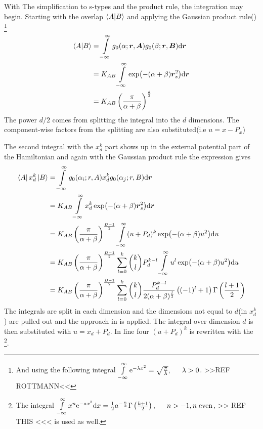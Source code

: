     With The simplification to s-types and the product rule, the integration
    may begin. Starting with the overlap $\braket{A}{B}$ and applying the
    Gaussian product rule() \footnote{And using the
    following integral $\infint \me^{-\lambda x^2} =
    \sqrt{\frac{\pi}{\lambda}},\indent \lambda>0$. >>REF ROTTMANN<<}
        \begin{align}
            \braket{A}{B} &= \int\limits^{\infty}_{-\infty} g_0(\alpha;\boldsymbol{{r}},\boldsymbol{{A}})
            g_0(\beta;\boldsymbol{{r}},\boldsymbol{{B}}) \mathrm{d}\boldsymbol{{r}} \nonumber \\
            &= K_{AB}\int\limits^{\infty}_{-\infty} \exp(-(\alpha+\beta)\boldsymbol{{r}}^2_s) \mathrm{d} \boldsymbol{{r}}
            \nonumber \\
            &= K_{AB} \left(\frac{\pi}{\alpha+\beta}\right)^{\frac{d}{2}}
            \label{eq:stypeOverlap}
        \end{align}
    The power $d/2$ comes from splitting the integral into the $d$ dimensions.
    The component-wise factors from the splitting are also substituted(i.e
    $u=x-P_x$)

    The second integral with the $x^k_d$ part shows up in the external
    potential part of the Hamiltonian and again with the Gaussian product rule
    the expression gives
        \begin{align}
            \bra{A}x^k_d\ket{B} &= \int\limits^{\infty}_{-\infty} g_0(\alpha_i;r,A) x^k_d
            g_0(\alpha_j;r,B) \mathrm{d} \boldsymbol{{r}} \nonumber \\
            &= K_{AB} \int\limits^{\infty}_{-\infty} x^k_d \exp(-(\alpha+\beta)\boldsymbol{{r}}^2_s)
            \mathrm{d}\boldsymbol{{r}} \nonumber \\
            &= K_{AB} \left(\frac{\pi}{\alpha+\beta}\right)^{\frac{D-1}{2}}
            \int\limits^{\infty}_{-\infty} (u+P_d)^k\exp(-(\alpha+\beta)u^2) \mathrm{d} u \nonumber \\
            &= K_{AB} \left(\frac{\pi}{\alpha+\beta}\right)^{\frac{D-1}{2}}
            \sum\limits_{l=0}^k {k\choose l} P^{k-l}_d \int\limits^{\infty}_{-\infty}
            u^l\exp(-(\alpha+\beta)u^2) \mathrm{d} u \nonumber \\
            &= K_{AB} \left(\frac{\pi}{\alpha+\beta}\right)^{\frac{D-1}{2}}
            \sum\limits_{l=0}^k {k\choose l}
            \frac{P^{k-l}_d}{2(\alpha+\beta)^{\frac{l}{2}}}
            \left((-1)^l+1\right) \Gamma\left(\frac{l+1}{2}\right)
        \end{align}
    The integrals are split in each dimension and the dimensions not equal to
    $d$(in $x^k_d$) are pulled out and the approach in  is
    applied. The integral over dimension $d$ is then substituted with
    $u=x_d+P_d$. In line four $(u+P_d)^k$ is rewritten with the \footnote{The integral $\infint x^n\me^{-ax^2}\md x =
    \frac{1}{2}a^{-\frac{n}{2}}\Gamma\left(\frac{k+1}{2}\right),\indent n>-1,
    n\;\text{even}$, >> REF THIS <<< is used as well.}.

